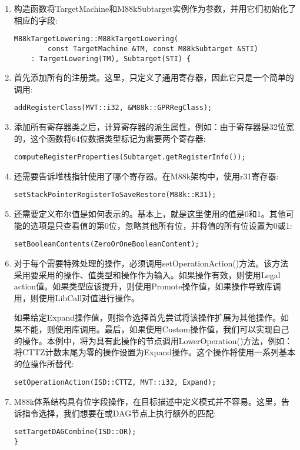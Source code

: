 \begin{enumerate}
\item 构造函数将TargetMachine和M88kSubtarget实例作为参数，并用它们初始化了相应的字段:
\begin{lstlisting}[caption={}]
M88kTargetLowering::M88kTargetLowering(
		const TargetMachine &TM, const M88kSubtarget &STI)
	: TargetLowering(TM), Subtarget(STI) {
\end{lstlisting}

\item 首先添加所有的注册类。这里，只定义了通用寄存器，因此它只是一个简单的调用:
\begin{lstlisting}[caption={}]
	addRegisterClass(MVT::i32, &M88k::GPRRegClass);
\end{lstlisting}

\item 添加所有寄存器类之后，计算寄存器的派生属性，例如：由于寄存器是32位宽的，这个函数将64位数据类型标记为需要两个寄存器:
\begin{lstlisting}[caption={}]
	computeRegisterProperties(Subtarget.getRegisterInfo());
\end{lstlisting}

\item 还需要告诉堆栈指针使用了哪个寄存器。在M88k架构中，使用r31寄存器:
\begin{lstlisting}[caption={}]
	setStackPointerRegisterToSaveRestore(M88k::R31);
\end{lstlisting}

\item 还需要定义布尔值是如何表示的。基本上，就是这里使用的值是0和1。其他可能的选项是只查看值的第0位，忽略其他所有位，并将值的所有位设置为0或1:
\begin{lstlisting}[caption={}]
	setBooleanContents(ZeroOrOneBooleanContent);
\end{lstlisting}

\item 对于每个需要特殊处理的操作，必须调用setOperationAction()方法。该方法采用要采用的操作、值类型和操作作为输入。如果操作有效，则使用Legal action值。如果类型应该提升，则使用Promote操作值，如果操作导致库调用，则使用LibCall对值进行操作。\par
如果给定Expand操作值，则指令选择首先尝试将该操作扩展为其他操作。如果不能，则使用库调用。最后，如果使用Custom操作值，我们可以实现自己的操作。本例中，将为具有此操作的节点调用LowerOperation()方法，例如：将CTTZ计数末尾为零的操作设置为Expand操作。这个操作将使用一系列基本的位操作所替代:
\begin{lstlisting}[caption={}]
	setOperationAction(ISD::CTTZ, MVT::i32, Expand);
\end{lstlisting}

\item M88k体系结构具有位字段操作，在目标描述中定义模式并不容易。这里，告诉指令选择，我们想要在或DAG节点上执行额外的匹配:
\begin{lstlisting}[caption={}]
	setTargetDAGCombine(ISD::OR);
}
\end{lstlisting}

\end{enumerate}

